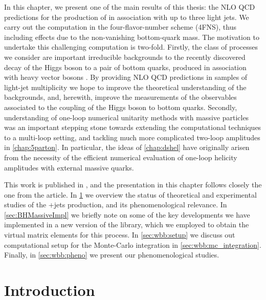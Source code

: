 In this chapter, we present one of the main results of this thesis:
the NLO QCD predictions for the production of \Wbb{} in association with up to three light jets.
We carry out the computation in the four-flavor-number scheme (4FNS), thus including effects due to the non-vanishing bottom-quark mass.
The motivation to undertake this challenging computation is two-fold.
Firstly, the class of processes we consider are important irreducible backgrounds to the recently discovered decay of the Higgs boson 
to a pair of bottom quarks, produced in association with heavy vector bosons \cite{Sirunyan:2018kst,Aaboud:2018zhk}.
By providing NLO QCD predictions in samples of light-jet multiplicity we hope to improve the theoretical 
understanding of the backgrounds, and, herewith, improve the measurements of the observables associated to 
the coupling of the Higgs boson to bottom quarks.
Secondly, understanding of one-loop numerical unitarity methods with massive particles
was an important stepping stone towards extending the computational techniques to a multi-loop setting,
and tackling much more complicated two-loop amplitudes in \cref{chap:5parton}.
In particular, the ideas of \cref{chap:dshel} have originally arisen from the necessity of the efficient
numerical evaluation of one-loop helicity amplitudes with external massive quarks.

This work is published in \cite{Anger:2017glm}, 
and the presentation in this chapter follows closely the one from the article.
In \cref{sec:wbb:relevance} we overview the status of theoretical and experimental studies of
the \Wbb{}+jets production, and its phenomenological relevance.
In \cref{sec:BHMassiveImpl} we briefly note on some of the
key developments we have implemented in a new version of the \BlackHat{} library,
which we employed to obtain the virtual matrix elements for this process.
In \cref{sec:wbb:setup} we discuss out computational setup for the Monte-Carlo integration
in \cref{sec:wbb:mc_integration}. Finally, in \cref{sec:wbb:pheno} we present our phenomenological studies.

\section{Introduction}
\label{sec:wbb:relevance}

